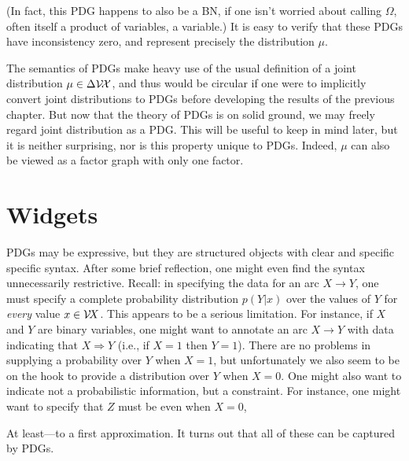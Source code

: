 \[
\]

(In fact, this PDG happens to also be a BN, if one isn't worried about calling $\Omega$, often itself a product of variables, a variable.)
It is easy to verify that these PDGs have inconsistency zero, and represent precisely the distribution $\mu$. 

The semantics of PDGs 
    make heavy use of the usual definition of a joint distribution $\mu \in \Delta \mathcal V\!\mathcal X$, and thus would be circular if one were to implicitly convert joint distributions to PDGs before developing the results of the previous chapter. 
But now that the theory of PDGs is on solid ground, we may freely regard joint distribution as a PDG. 
This will be useful to keep in mind later, but it is neither surprising, nor is this property unique to PDGs. 
Indeed, $\mu$ can also be viewed as a factor graph with only one factor. 

\section{Widgets}

PDGs may be expressive, but they are structured objects with clear and specific specific syntax.
After some brief reflection, one might even find the syntax unnecessarily restrictive. 
Recall: in specifying the data for an arc $X \to Y$, one must specify a complete probability distribution $p(Y | x)$ over the values of $Y$ for \emph{every} value $x \in \mathcal V\!X$. 
This appears to be a serious limitation.
For instance, if $X$ and $Y$ are binary variables, one might want to 
annotate an arc $X \to Y$ with data indicating that $X \Rightarrow Y$
    (i.e., if $X=1$ then $Y=1$).
There are no problems in supplying a probability over $Y$ when $X{=}1$,
but unfortunately we also seem to be on the hook to provide
    a distribution over $Y$ when $X{=}0$. 
One might also want to indicate not a probabilistic information, but a constraint.
For instance, one might want to specify that $Z$ must be even when $X{=}0$, 

At least---to a first approximation. 
It turns out that all of these can be captured by PDGs. 

